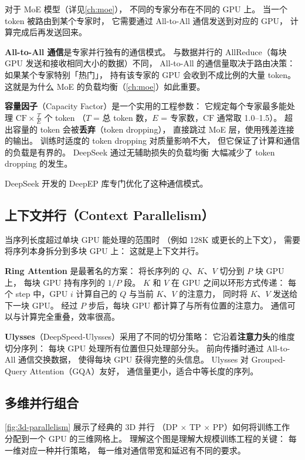对于 MoE 模型（详见\cref{ch:moe}），
不同的专家分布在不同的 GPU 上。
当一个 token 被路由到某个专家时，
它需要通过 All-to-All 通信发送到对应的 GPU，
计算完成后再发送回来。

\textbf{All-to-All 通信}是专家并行独有的通信模式。
与数据并行的 AllReduce（每块 GPU 发送和接收相同大小的数据）不同，
All-to-All 的通信量取决于路由决策：
如果某个专家特别「热门」，
持有该专家的 GPU 会收到不成比例的大量 token。
这就是为什么 MoE 的负载均衡（\cref{ch:moe}）如此重要。

\textbf{容量因子}（Capacity Factor）是一个实用的工程参数：
它规定每个专家最多能处理 $\mathrm{CF} \times \frac{T}{E}$ 个 token
（$T$ = 总 token 数，$E$ = 专家数，$\mathrm{CF}$ 通常取 1.0--1.5）。
超出容量的 token 会被\textbf{丢弃}（token dropping），
直接跳过 MoE 层，使用残差连接的输出。
训练时适度的 token dropping 对质量影响不大，
但它保证了计算和通信的负载是有界的。
DeepSeek 通过无辅助损失的负载均衡
大幅减少了 token dropping 的发生。

DeepSeek 开发的 DeepEP 库专门优化了这种通信模式。

\subsection{上下文并行（Context Parallelism）}

当序列长度超过单块 GPU 能处理的范围时
（例如 128K 或更长的上下文），
需要将序列本身拆分到多块 GPU 上：
这就是上下文并行。

\textbf{Ring Attention} 是最著名的方案：
将长序列的 $Q$、$K$、$V$ 切分到 $P$ 块 GPU 上，
每块 GPU 持有序列的 $1/P$ 段。
$K$ 和 $V$ 在 GPU 之间以环形方式传递：
每个 step 中，GPU $i$ 计算自己的 $Q$ 与当前 $K$、$V$ 的注意力，
同时将 $K$、$V$ 发送给下一块 GPU。
经过 $P$ 步后，每块 GPU 都计算了与所有位置的注意力。
通信可以与计算完全重叠，效率很高。

\textbf{Ulysses}（DeepSpeed-Ulysses）采用了不同的切分策略：
它沿着\textbf{注意力头}的维度切分序列：
每块 GPU 处理所有位置但只处理部分头。
前向传播时通过 All-to-All 通信交换数据，
使得每块 GPU 获得完整的头信息。
Ulysses 对 Grouped-Query Attention（GQA）友好，
通信量更小，适合中等长度的序列。

\subsection{多维并行组合}
\label{sec:5d-parallelism}

\cref{fig:3d-parallelism} 展示了经典的 3D 并行
（DP $\times$ TP $\times$ PP）如何将训练工作
分配到一个 GPU 的三维网格上。
理解这个图是理解大规模训练工程的关键：
每一维对应一种并行策略，
每一维对通信带宽和延迟有不同的要求。

